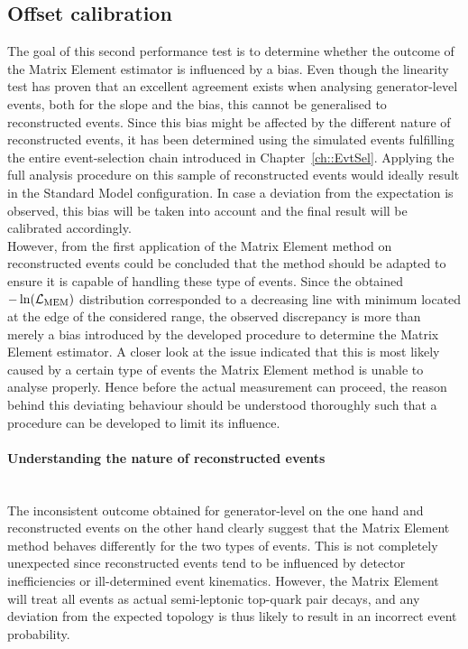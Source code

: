 \subsection{Offset calibration} \label{subsec::CutValue}

The goal of this second performance test is to determine whether the outcome of the Matrix Element estimator is influenced by a bias.
Even though the linearity test has proven that an excellent agreement exists when analysing generator-level events, both for the slope and the bias, this cannot be generalised to reconstructed events.
Since this bias might be affected by the different nature of reconstructed events, it has been determined using the simulated events fulfilling the entire event-selection chain introduced in Chapter~\ref{ch::EvtSel}.
Applying the full analysis procedure on this sample of reconstructed events would ideally result in the Standard Model configuration.
In case a deviation from the expectation is observed, this bias will be taken into account and the final result will be calibrated accordingly. 
\\

However, from the first application of the Matrix Element method on reconstructed events could be concluded that the method should be adapted to ensure it is capable of handling these type of events.
Since the obtained $-\ln(\mathcal{L}_{\textrm{MEM}})$ distribution corresponded to a decreasing line with minimum located at the edge of the considered range, the observed discrepancy is more than merely a bias introduced by the developed procedure to determine the Matrix Element estimator.
A closer look at the issue indicated that this is most likely caused by a certain type of events the Matrix Element method is unable to analyse properly.
Hence before the actual measurement can proceed, the reason behind this deviating behaviour should be understood thoroughly such that a procedure can be developed to limit its influence.

\paragraph{Understanding the nature of reconstructed events} \hfill \\ %

The inconsistent outcome obtained for generator-level on the one hand and reconstructed events on the other hand clearly suggest that the Matrix Element method behaves differently for the two types of events.
This is not completely unexpected since reconstructed events tend to be influenced by detector inefficiencies or ill-determined event kinematics.
However, the Matrix Element will treat all events as actual semi-leptonic top-quark pair decays, and any deviation from the expected topology is thus likely to result in an incorrect event probability.
\\

